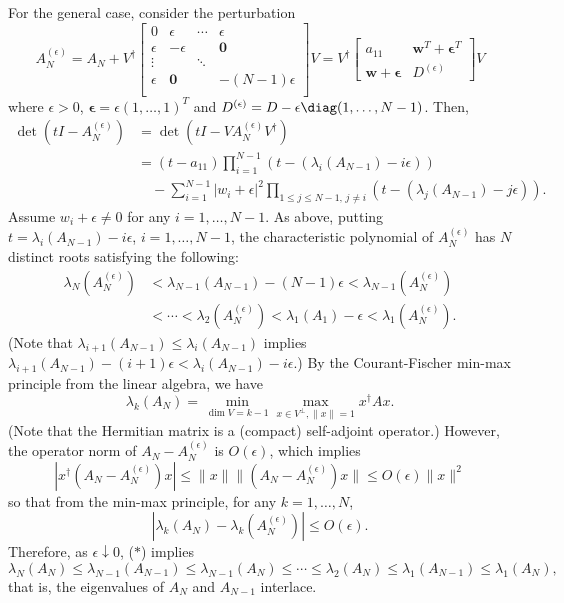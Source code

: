 \documentclass{homework}
\begin{document}
{For the general case, consider the perturbation
\[ A_{N}^{(\epsilon)} = A_N + V^\dagger\begin{bmatrix}
        0        & \epsilon  & \cdots & \epsilon       \\
        \epsilon & -\epsilon &        & \mathbf 0      \\
        \vdots   &           & \ddots &                \\
        \epsilon & \mathbf 0 &        & -(N-1)\epsilon \\
    \end{bmatrix}V = V^\dagger \begin{bmatrix}
        a_{11}                           & \mathbf w^T + \boldsymbol \epsilon^T \\
        \mathbf w + \boldsymbol \epsilon & D^{(\epsilon)}
    \end{bmatrix} V
\]
where $\epsilon>0$, $\boldsymbol\epsilon = \epsilon(1,\dots,1)^T$ and $D^{(\epsilon)} = D - \epsilon\diag(1,\dots ,N-1)$. Then,
\begin{align*}
    \det(t I - A_N^{(\epsilon)}) & = \det(t I - V A_N^{(\epsilon)}V^\dagger)
    \\ &= (t - a_{11})\prod_{i=1}^{N-1} (t - (\lambda_i(A_{N-1}) - i\epsilon))
    \\ &\quad - \sum_{i=1}^{N-1} |w_i+\epsilon|^2 \prod_{1\le j\le N-1,\,j\ne i} (t - (\lambda_j(A_{N-1}) - j\epsilon)).
\end{align*}
Assume $w_i + \epsilon \ne 0$ for any $i=1,\dots,N-1$. As above, putting $t = \lambda_i(A_{N-1}) - i\epsilon$, $i=1,\dots,N-1$, the characteristic polynomial of $A_{N}^{(\epsilon)}$ has $N$ distinct roots satisfying the following:
\begin{align*}
    \lambda_N(A_N^{(\epsilon)}) & < \lambda_{N-1}(A_{N-1}) - (N-1)\epsilon< \lambda_{N-1}(A_N^{(\epsilon)})
    \\ & <\cdots< \lambda_2(A_N^{(\epsilon)}) < \lambda_1(A_1) - \epsilon < \lambda_1(A_N^{(\epsilon)}). \tag{$*$}
\end{align*}
(Note that $\lambda_{i+1}(A_{N-1}) \le \lambda_i(A_{N-1})$ implies $\lambda_{i+1}(A_{N-1}) - (i+1)\epsilon < \lambda_i(A_{N-1}) - i\epsilon.$)
By the Courant-Fischer min-max principle from the linear algebra, we have
\[ \lambda_k(A_N) = \min_{\dim V = k-1} \max_{x\in V^\perp, \|x\|=1} x^\dagger A x. \]
(Note that the Hermitian matrix is a (compact) self-adjoint operator.) However, the operator norm of $A_N - A_N^{(\epsilon)}$ is $O(\epsilon)$, which implies
\[ |x^\dagger (A_N - A_N^{(\epsilon)})x| \le \|x\| \|(A_N - A_N^{(\epsilon)})x\| \le O(\epsilon)\|x\|^2 \]
so that from the min-max principle, for any $k=1,\dots,N$,
\[ |\lambda_k(A_N) - \lambda_k(A_N^{(\epsilon)})| \le O(\epsilon). \]
Therefore, as $\epsilon \downarrow 0$, ($*$) implies
\[ \lambda_N(A_N) \le \lambda_{N-1}(A_{N-1}) \le \lambda_{N-1}(A_N)\le\cdots \le \lambda_2(A_N) \le \lambda_1(A_{N-1}) \le \lambda_1(A_N), \]
that is, the eigenvalues of $A_N$ and $A_{N-1}$ interlace.
}
\end{document}
